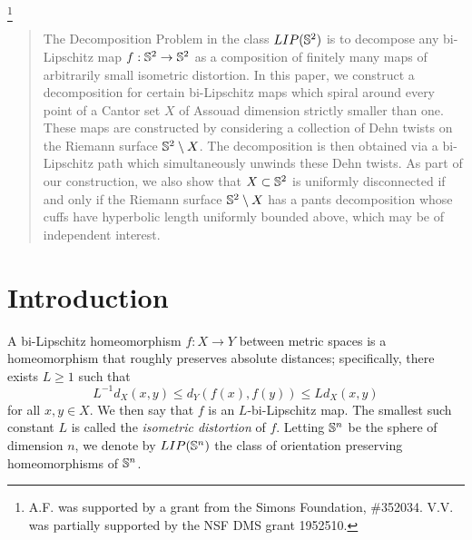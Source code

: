 \documentclass{amsart}
\begin{document}
\author{Vyron Vellis}
\address{Department of Mathematics, The University of Tennessee, Knoxville, TN 37966, USA}

\thanks{A.F. was supported by a grant from the Simons Foundation, \#352034. V.V. was partially supported by the NSF DMS grant 1952510.}

\maketitle

\begin{abstract}
The Decomposition Problem in the class $LIP(\S^2)$ is to decompose any bi-Lipschitz map $f:\S^2 \to \S^2$ as a composition of finitely many maps of arbitrarily small isometric distortion. In this paper, we construct a decomposition for certain bi-Lipschitz maps which spiral around every point of a Cantor set $X$ of Assouad dimension strictly smaller than one. These maps are constructed by considering a collection of Dehn twists on the Riemann surface $\S^2 \setminus X$. The decomposition is then obtained via a bi-Lipschitz path which simultaneously unwinds these Dehn twists. As part of our construction, we also show that $X \subset \S^2$ is uniformly disconnected if and only if the Riemann surface $\S^2 \setminus X$ has a pants decomposition whose cuffs have hyperbolic length uniformly bounded above, which may be of independent interest.
\end{abstract}


\section{Introduction}



A bi-Lipschitz homeomorphism $f:X\to Y$ between metric spaces is a homeomorphism that roughly preserves absolute distances; specifically, there exists $L\geq 1$ such that
\[ L^{-1} d_X(x,y) \leq d_Y( f(x) , f(y) ) \leq Ld_X(x,y)\]
for all $x,y\in X$. We then say that $f$ is an $L$-bi-Lipschitz map. The smallest such constant $L$ is called the {\it isometric distortion} of $f$. Letting $\S^n$ be the sphere of dimension $n$, we denote by $LIP(\S^n)$ the class of orientation preserving homeomorphisms of $\S^n$. 
\end{document}
